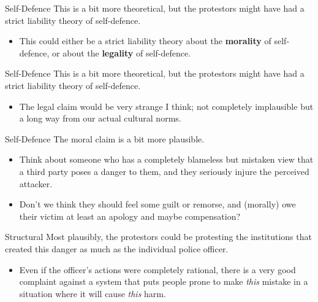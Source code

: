 \documentclass[
  17pt,
  letterpaper,
  ignorenonframetext,
  aspectratio=169,
  xcolor={dvipsnames}]{beamer}
\providecommand{\tightlist}{%
  \setlength{\itemsep}{0pt}\setlength{\parskip}{0pt}}\usepackage{longtable,booktabs,array}
\begin{document}
\begin{frame}{Self-Defence}
\protect\hypertarget{self-defence}{}
This is a bit more theoretical, but the protestors might have had a
strict liability theory of self-defence.

\begin{itemize}[<+->]
\tightlist
\item
  This could either be a strict liability theory about the
  \textbf{morality} of self-defence, or about the \textbf{legality} of
  self-defence.
\end{itemize}
\end{frame}

\begin{frame}{Self-Defence}
\protect\hypertarget{self-defence-1}{}
This is a bit more theoretical, but the protestors might have had a
strict liability theory of self-defence.

\begin{itemize}[<+->]
\tightlist
\item
  The legal claim would be very strange I think; not completely
  implausible but a long way from our actual cultural norms.
\end{itemize}
\end{frame}

\begin{frame}{Self-Defence}
\protect\hypertarget{self-defence-2}{}
The moral claim is a bit more plausible.

\begin{itemize}[<+->]
\tightlist
\item
  Think about someone who has a completely blameless but mistaken view
  that a third party poses a danger to them, and they seriously injure
  the perceived attacker.
\item
  Don't we think they should feel some guilt or remorse, and (morally)
  owe their victim at least an apology and maybe compensation?
\end{itemize}
\end{frame}

\begin{frame}{Structural}
\protect\hypertarget{structural}{}
Most plausibly, the protestors could be protesting the institutions that
created this danger as much as the individual police officer.

\begin{itemize}[<+->]
\tightlist
\item
  Even if the officer's actions were completely rational, there is a
  very good complaint against a system that puts people prone to make
  \emph{this} mistake in a situation where it will cause \emph{this}
  harm.
\end{itemize}
\end{frame}
\end{document}
